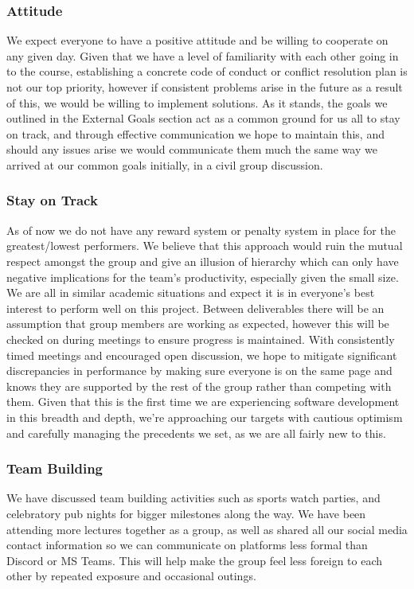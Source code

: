 \documentclass{article}
\begin{document}
\subsubsection*{Attitude}

We expect everyone to have a positive attitude and be willing to cooperate on any given day. Given that we have a level of familiarity with each other going in to the course, establishing a concrete code of conduct or conflict resolution plan is not our top priority, however if consistent problems arise in the future as a result of this, we would be willing to implement solutions. As it stands, the goals we outlined in the External Goals section act as a common ground for us all to stay on track, and through effective communication we hope to maintain this, and should any issues arise we would communicate them much the same way we arrived at our common goals initially, in a civil group discussion.

\subsubsection*{Stay on Track}

As of now we do not have any reward system or penalty system in place for the greatest/lowest performers. We believe that this approach would ruin the mutual respect amongst the group and give an illusion of hierarchy which can only have negative implications for the team's productivity, especially given the small size. We are all in similar academic situations and expect it is in everyone's best interest to perform well on this project. Between deliverables there will be an assumption that group members are working as expected, however this will be checked on during meetings to ensure progress is maintained. With consistently timed meetings and encouraged open discussion, we hope to mitigate significant discrepancies in performance by making sure everyone is on the same page and knows they are supported by the rest of the group rather than competing with them. Given that this is the first time we are experiencing software development in this breadth and depth, we're approaching our targets with cautious optimism and carefully managing the precedents we set, as we are all fairly new to this.

\subsubsection*{Team Building}

We have discussed team building activities such as sports watch parties, and celebratory pub nights for bigger milestones along the way. We have been attending more lectures together as a group, as well as shared all our social media contact information so we can communicate on platforms less formal than Discord or MS Teams. This will help make the group feel less foreign to each other by repeated exposure and occasional outings.
\end{document}
